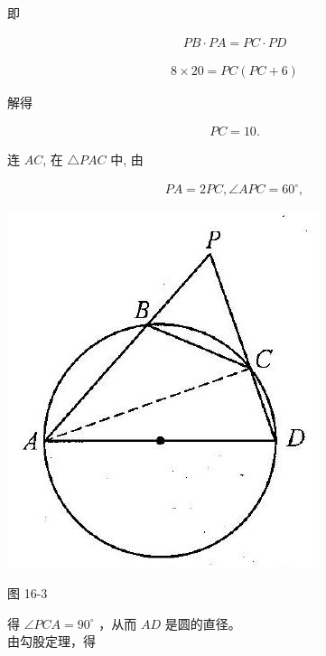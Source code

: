 \documentclass[10pt]{article}
\begin{document}
即

\begin{align*}
P B \cdot P A=P C \cdot P D
\end{align*}

\begin{align*}
8 \times 20=P C(P C+6)
\end{align*}

解得

\begin{align*}
P C=10 .
\end{align*}

连 $A C$, 在 $\triangle P A C$ 中, 由

\begin{align*}
P A=2 P C, \angle A P C=60^{\circ},
\end{align*}

\begin{center}
\includegraphics[max width=\textwidth]{2024_10_30_2c8f45efd4a519b08e1ag-148}
\end{center}

图 16-3

得 $\angle P C A=90^{\circ}$ ，从而 $A D$ 是圆的直径。\\
由勾股定理，得
\end{document}
